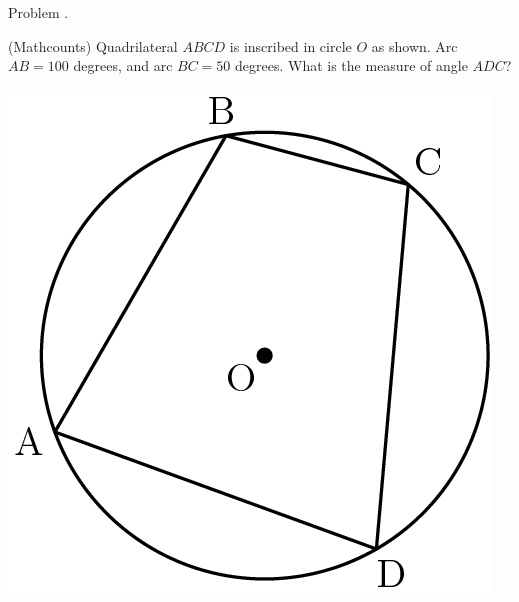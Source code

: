\documentclass[9pt]{beamer}
\newcounter{problem}[section]
\begin{document}
\begin{frame}[t, fragile]{Problem \thesection.\theproblem}
    \begin{block}{}
    (Mathcounts) Quadrilateral $ABCD$ is inscribed in circle $O$ as shown. Arc $AB = 100$ degrees, and arc $BC = 50$ degrees. What is the measure of angle $ADC$?
    \end{block}
    \begin{center}
        \includegraphics[scale=0.4]{915669443e24631474bf80a6c6e4084b6a6668ec.png}
    \end{center}
    

\end{frame}
\end{document}
